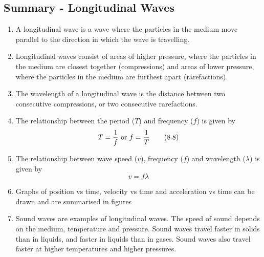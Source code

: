             \subsection{ Summary - Longitudinal Waves}
            \nopagebreak
      \label{m38783*id293550}\begin{enumerate}[noitemsep, label=\textbf{\arabic*}. ] 
            \label{m38783*uid20}\item A longitudinal wave is a wave where the particles in the medium move parallel to the direction in which the wave is travelling.
\label{m38783*uid21}\item Longitudinal waves consist of areas of higher pressure, where the particles in the medium are closest together (compressions) and areas of lower pressure, where the particles in the medium are furthest apart (rarefactions).
\label{m38783*uid22}\item The wavelength of a longitudinal wave is the distance between two consecutive compressions, or two consecutive rarefactions.
\label{m38783*uid23}\item The relationship between the period ($T$) and frequency ($f$) is given by
\label{m38783*id293619}\nopagebreak\noindent{}
    \begin{equation}
    T=\frac{1}{f}\phantom{\rule{3pt}{0ex}}\mathrm{or}\phantom{\rule{3pt}{0ex}}f=\frac{1}{T}\tag{8.8}
      \end{equation}
    \label{m38783*uid24}\item The relationship between wave speed ($v$), frequency ($f$) and wavelength ($\lambda $) is given by
\label{m38783*id293694}\nopagebreak\noindent{}
    \begin{equation}
    v=f\lambda \tag{8.9}
      \end{equation}
    \label{m38783*uid25}\item Graphs of position vs time, velocity vs time and acceleration vs time can be drawn and are summarised in figures
\label{m38783*uid26}\item Sound waves are examples of longitudinal waves. The speed of sound depends on the medium, temperature and pressure. Sound waves travel faster in solids than in liquids, and faster in liquids than in gases. Sound waves also travel faster at higher temperatures and higher pressures.
\end{enumerate}
   \label{m38783*cid9}
